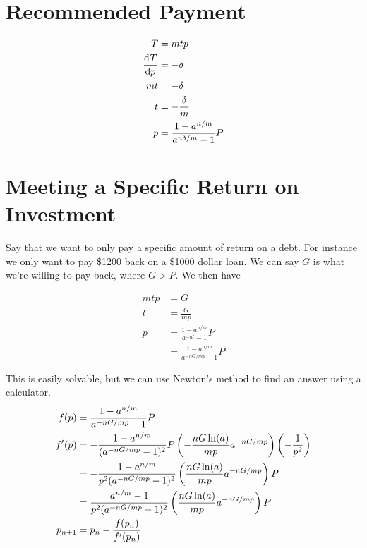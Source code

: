 \documentclass[12pt]{article}
\begin{document}
\section{Recommended Payment}

\begin{align*}
    T &= mtp\\
    \dod{T}{p} &= -\delta\\
    mt &= -\delta\\
    t &= -\frac{\delta}{m}\\
    p &= \frac{1 - a^{n/m}}{a^{n\delta/m} - 1} P
\end{align*}


\section{Meeting a Specific Return on Investment}

Say that we want to only pay a specific amount of return on a debt.
For instance we only want to pay \$1200 back on a \$1000 dollar loan.
We can say $G$ is what we're willing to pay back, where $G > P$.
We then have

\begin{align*}
    mtp &= G\\
    t &= \frac{G}{mp}\\
    p &= \frac{1 - a^{n/m}}{a^{-nt} - 1} P\\
      &= \frac{1 - a^{n/m}}{a^{-nG/mp} - 1} P
\end{align*}

This is easily solvable, but we can use Newton's method to find an answer using
a calculator.
\begin{align*}
    f(p) &= \frac{1 - a^{n/m}}{a^{-nG/mp} - 1} P\\
    f'(p) &= -\frac{1 - a^{n/m}}{(a^{-nG/mp} - 1)^2} P \del{-\frac{nG \ln(a)}{mp} a^{-nG/mp}} \del{-\frac{1}{p^2}}\\
          &= -\frac{1 - a^{n/m}}{p^2 (a^{-nG/mp} - 1)^2} \del{\frac{nG \ln(a)}{mp} a^{-nG/mp}} P\\
          &= \frac{a^{n/m} - 1}{p^2 (a^{-nG/mp} - 1)^2} \del{\frac{nG \ln(a)}{mp} a^{-nG/mp}} P\\
    p_{n + 1} &= p_n - \frac{f(p_n)}{f'(p_n)}
\end{align*}
\end{document}
